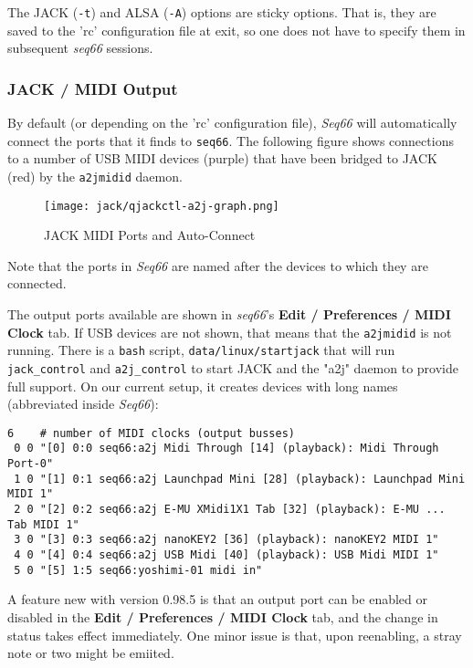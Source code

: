   The JACK (\texttt{-t}) and ALSA (\texttt{-A}) options are sticky options.
   That is, they are saved to the 'rc' configuration file at exit,
   so one does not have to specify them in subsequent \textsl{seq66} sessions.

\subsubsection{JACK / MIDI Output}
\label{subsubsec:jack_midi_output}

   By default (or depending on the 'rc' configuration file),
   \textsl{Seq66} will
   automatically connect the ports that it finds to \texttt{seq66}.
   The following figure shows connections to a number of USB MIDI devices
   (purple) that have been bridged to JACK (red) by the \texttt{a2jmidid}
   daemon.

\begin{figure}[H]
   \centering 
   \texttt{[image: jack/qjackctl-a2j-graph.png]}
   \caption{JACK MIDI Ports and Auto-Connect}
   \label{fig:jack_midi_ports_auto_connect}
\end{figure}

   Note that the ports in \textsl{Seq66} are named after the devices to which
   they are connected.

	The output ports available are shown in \textsl{seq66}'s
	\textbf{Edit / Preferences / MIDI Clock} tab.
   If USB devices are not shown, that means
   that the \texttt{a2jmidid} is not running.
   There is a \texttt{bash} script, \texttt{data/linux/startjack}
   that will run \texttt{jack\_control} and \texttt{a2j\_control} to start JACK
   and the "a2j" daemon to provide full support.
   On our current setup, it creates devices with long names (abbreviated inside
   \textsl{Seq66}):

   \begin{verbatim}
6    # number of MIDI clocks (output busses)
 0 0 "[0] 0:0 seq66:a2j Midi Through [14] (playback): Midi Through Port-0"
 1 0 "[1] 0:1 seq66:a2j Launchpad Mini [28] (playback): Launchpad Mini MIDI 1"
 2 0 "[2] 0:2 seq66:a2j E-MU XMidi1X1 Tab [32] (playback): E-MU ... Tab MIDI 1"
 3 0 "[3] 0:3 seq66:a2j nanoKEY2 [36] (playback): nanoKEY2 MIDI 1"
 4 0 "[4] 0:4 seq66:a2j USB Midi [40] (playback): USB Midi MIDI 1"
 5 0 "[5] 1:5 seq66:yoshimi-01 midi in"
   \end{verbatim}

   A feature new with version 0.98.5 is that an output port can be enabled or
   disabled in the 
	\textbf{Edit / Preferences / MIDI Clock} tab,
   and the change in status takes effect immediately.
   One minor issue is that, upon reenabling, a stray note or two might be
   emiited.


